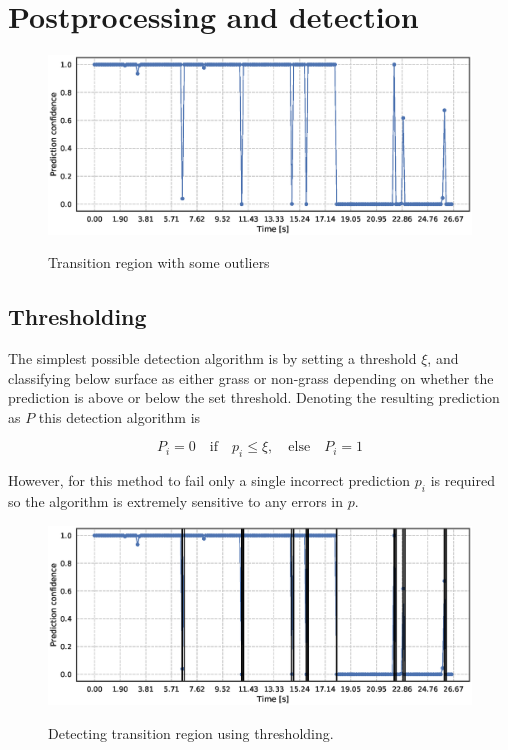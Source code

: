 \iffalse
\section{Postprocessing and detection}


\begin{figure}
	\includegraphics[scale=0.5]{figs_temp/detect_nothing}
	\label{fig:detect_no}
	\caption{Transition region with some outliers}
\end{figure}

\subsection{Thresholding}

The simplest possible detection algorithm is by setting a threshold $\xi$, and classifying below surface as either grass or non-grass depending on whether the prediction is above or below the set threshold. Denoting the resulting prediction as $P$ this detection algorithm is 

\begin{equation}
	P_i=0 \quad\text{if}\quad p_i\leq\xi, \quad
	\text{else} \quad P_i=1
\end{equation}

However, for this method to fail only a single incorrect prediction $p_i$ is required so the algorithm is extremely sensitive to any errors in $p$.

\begin{figure}
	\includegraphics[scale=0.5]{figs_temp/detect_thresh}
	\label{fig:detect_thresh}
	\caption{Detecting transition region using thresholding.}
\end{figure}

